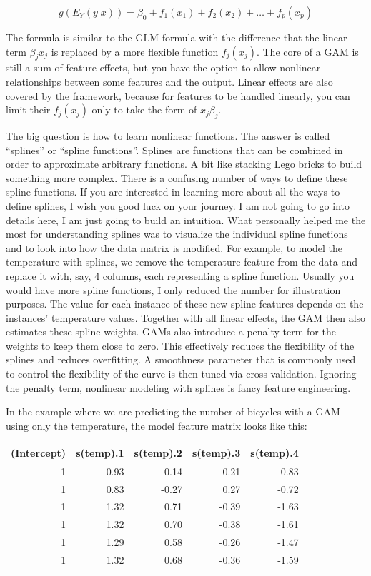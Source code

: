 \documentclass[
  12pt,
]{krantz}
\begin{document}
\[g(E_Y(y|x))=\beta_0+f_1(x_{1})+f_2(x_{2})+\ldots+f_p(x_{p})\]

The formula is similar to the GLM formula with the difference that the linear term \(\beta_j{}x_{j}\) is replaced by a more flexible function \(f_j(x_{j})\).
The core of a GAM is still a sum of feature effects, but you have the option to allow nonlinear relationships between some features and the output.
Linear effects are also covered by the framework, because for features to be handled linearly, you can limit their \(f_j(x_{j})\) only to take the form of \(x_{j}\beta_j\).

The big question is how to learn nonlinear functions.
The answer is called ``splines'' or ``spline functions''.
Splines are functions that can be combined in order to approximate arbitrary functions.
A bit like stacking Lego bricks to build something more complex.
There is a confusing number of ways to define these spline functions.
If you are interested in learning more about all the ways to define splines, I wish you good luck on your journey.
I am not going to go into details here, I am just going to build an intuition.
What personally helped me the most for understanding splines was to visualize the individual spline functions and to look into how the data matrix is modified.
For example, to model the temperature with splines, we remove the temperature feature from the data and replace it with, say, 4 columns, each representing a spline function.
Usually you would have more spline functions, I only reduced the number for illustration purposes.
The value for each instance of these new spline features depends on the instances' temperature values.
Together with all linear effects, the GAM then also estimates these spline weights.
GAMs also introduce a penalty term for the weights to keep them close to zero.
This effectively reduces the flexibility of the splines and reduces overfitting.
A smoothness parameter that is commonly used to control the flexibility of the curve is then tuned via cross-validation.
Ignoring the penalty term, nonlinear modeling with splines is fancy feature engineering.

In the example where we are predicting the number of bicycles with a GAM using only the temperature, the model feature matrix looks like this:

\begin{tabular}{r|r|r|r|r}
\hline
(Intercept) & s(temp).1 & s(temp).2 & s(temp).3 & s(temp).4\\
\hline
1 & 0.93 & -0.14 & 0.21 & -0.83\\
\hline
1 & 0.83 & -0.27 & 0.27 & -0.72\\
\hline
1 & 1.32 & 0.71 & -0.39 & -1.63\\
\hline
1 & 1.32 & 0.70 & -0.38 & -1.61\\
\hline
1 & 1.29 & 0.58 & -0.26 & -1.47\\
\hline
1 & 1.32 & 0.68 & -0.36 & -1.59\\
\hline
\end{tabular}
\end{document}
